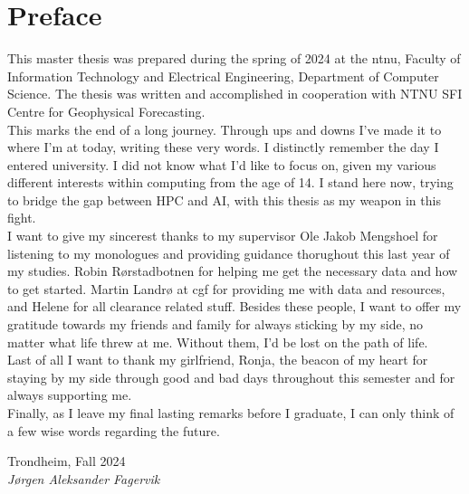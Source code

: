 \chapter*{Preface}

This master thesis was prepared during the spring of 2024 at the \acrfull{ntnu}, Faculty of Information Technology and Electrical Engineering, Department of Computer Science. The thesis was written and accomplished in cooperation with NTNU SFI Centre for Geophysical Forecasting. \\

This marks the end of a long journey. Through ups and downs I've made it to where I'm at today, writing these very words. I distinctly remember the day I entered university. I did not know what I'd like to focus on, given my various different interests within computing from the age of 14. I stand here now, trying to bridge the gap between HPC and AI, with this thesis as my weapon in this fight. \\

I want to give my sincerest thanks to my supervisor Ole Jakob Mengshoel for listening to my monologues and providing guidance thorughout this last year of my studies. Robin Rørstadbotnen for helping me get the necessary data and how to get started. Martin Landrø at \acrlong{cgf} for providing me with data and resources, and Helene for all clearance related stuff. Besides these people, I want to offer my gratitude towards my friends and family for always sticking by my side, no matter what life threw at me. Without them, I'd be lost on the path of life. \\

Last of all I want to thank my girlfriend, Ronja, the beacon of my heart for staying by my side through good and bad days throughout this semester and for always supporting me.\\

Finally, as I leave my final lasting remarks before I graduate, I can only think of a few wise words regarding the future.

\begin{flushright}
Trondheim, Fall 2024  \\
\textit{Jørgen Aleksander Fagervik}
\end{flushright}